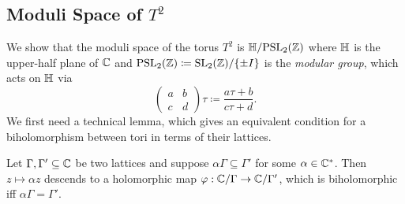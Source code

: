 \documentclass[../Moduli_Spaces_of_Riemann_Surfaces.tex]{subfiles}
\begin{document}
    \subsection{Moduli Space of $T^2$}
    We show that the moduli space of the torus $T^2$ is $\mathbb{H}/\!\operatorname{PSL}_{2}\!\left(\mathbb{Z}\right)$ where $\mathbb{H}$ is the upper-half plane of $\mathbb{C}$ and $\operatorname{PSL}_{2}\!\left(\mathbb{Z}\right)\coloneqq\operatorname{SL}_2\!\left(\mathbb{Z}\right)\!/\!\left\{\pm I\right\}$ is the \textit{modular group}, which acts on $\mathbb{H}$ via
    \begin{equation*}
        \begin{pmatrix}
            a & b \\
            c & d
        \end{pmatrix}\tau\coloneqq\frac{a\tau+b}{c\tau+d}.
    \end{equation*}
    We first need a technical lemma, which gives an equivalent condition for a biholomorphism between tori in terms of their lattices.
    \begin{lemma}\label{4.1:lem:moduli_space_torus_1}
        Let $\Gamma,\Gamma'\subseteq\mathbb{C}$ be two lattices and suppose $\alpha\Gamma\subseteq\Gamma'$ for some $\alpha\in\mathbb{C}^\ast$. Then $z\mapsto\alpha z$ descends to a holomorphic map $\varphi:\mathbb{C}/\Gamma\to\mathbb{C}/\Gamma'$, which is biholomorphic iff $\alpha\Gamma=\Gamma'$.
    \end{lemma}
\end{document}
